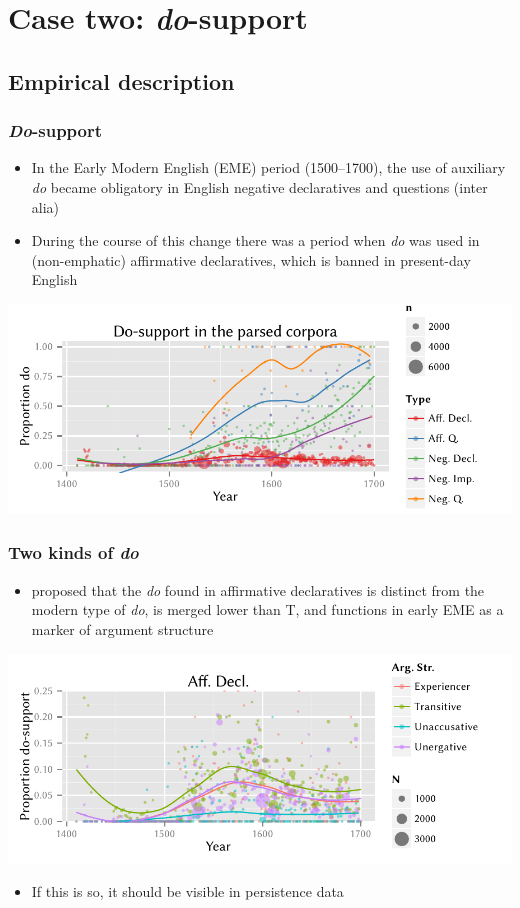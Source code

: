 \documentclass{digs-slides}
\begin{document}
\section{Case two: \emph{do}-support}
\label{sec:case-two:-emphdo}

\subsection{Empirical description}
\label{sec:empir-descr}

\begin{frame}
    \frametitle{\emph{Do}-support}
    \begin{itemize}
      \item In the Early Modern English (EME) period (1500–1700),
        the use of auxiliary \emph{do} became obligatory in English
        negative declaratives and questions (inter alia)
      \item During the course of this change there was a period when
        \emph{do} was used in (non-emphatic) affirmative declaratives,
        which is banned in present-day English
    \end{itemize}
    \includegraphics[width=\textwidth]{static-figures/do-all}
\end{frame}

\begin{frame}
    \frametitle{Two kinds of \emph{do}}
    \begin{itemize}
      \item \textcite{Ecay2012a} proposed that the \emph{do} found in
        affirmative declaratives is distinct from the modern type of
        \emph{do}, is merged lower than T, and functions in early EME as
        a marker of argument structure
    \end{itemize}
    \includegraphics[width=\textwidth]{static-figures/do-aff}
    \begin{itemize}
      \item If this is so, it should be visible in persistence data
    \end{itemize}
\end{frame}
\end{document}
